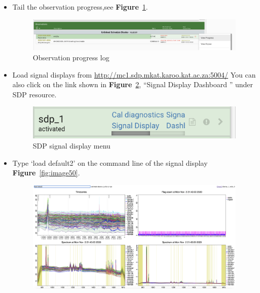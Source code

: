 \begin{itemize}
\item Tail the observation progress,see  \textbf{Figure}~\ref{fig:image100}.


\begin{figure}[H]
	\centering
	\includegraphics[scale=0.2]{Chapters/images/image100.png}
	
	\caption{Observation progress log}
	\label{fig:image100}
\end{figure}


\item Load signal displays from  \url{ http://mc1.sdp.mkat.karoo.kat.ac.za:5004/}
You can also click on the link shown in \textbf{Figure}~\ref{fig:image126}, “Signal Display Dashboard ” under SDP resource.

\begin{figure}[H]
	\centering
	\includegraphics[scale=1]{Chapters/images/image126.png}
	
	\caption{SDP signal display menu }
	\label{fig:image126}
\end{figure}

\item Type ‘load default2’ on the command line of the signal display \textbf{Figure}~\ref{fig:image50}.


\begin{figure}[H]
	\centering
	\includegraphics[scale=0.2]{Chapters/images/image50.png}
	

\end{figure}
\end{itemize}
